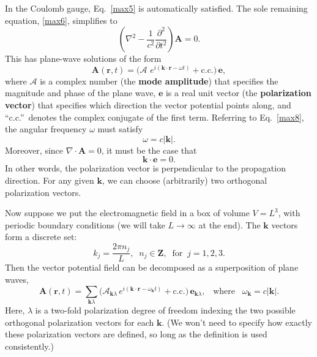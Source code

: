 \documentclass[pra,12pt]{revtex4}
\begin{document}
In the Coulomb gauge, Eq.~\eqref{max5} is automatically satisfied.
The sole remaining equation, \eqref{max6}, simplifies to
\begin{equation}
  \left(\nabla^2 - \frac{1}{c^2}\frac{\partial^2}{\partial t^2}\right)
  \mathbf{A} = 0. \label{max8}
\end{equation}
This has plane-wave solutions of the form
\begin{equation}
  \mathbf{A}(\mathbf{r},t) = \Big(\mathcal{A}\, \,
  e^{i(\mathbf{k}\cdot\mathbf{r} - \omega t)} + \mathrm{c.c.}\Big)\,
  \mathbf{e},
  \label{lightplanewave}
\end{equation}
where $\mathcal{A}$ is a complex number (the \textbf{mode amplitude})
that specifies the magnitude and phase of the plane wave, $\mathbf{e}$
is a real unit vector (the \textbf{polarization vector}) that
specifies which direction the vector potential points along, and
``c.c.''~denotes the complex conjugate of the first term.  Referring
to Eq.~\eqref{max8}, the angular frequency $\omega$ must satisfy
\begin{equation}
  \omega = c|\mathbf{k}|.
\end{equation}
Moreover, since $\nabla \cdot \mathbf{A} = 0$, it must be the case
that
\begin{equation}
  \mathbf{k} \cdot \mathbf{e} = 0.
\end{equation}
In other words, the polarization vector is perpendicular to the
propagation direction.  For any given $\mathbf{k}$, we can choose
(arbitrarily) two orthogonal polarization vectors.

Now suppose we put the electromagnetic field in a box of volume $V =
L^3$, with periodic boundary conditions (we will take $L \rightarrow
\infty$ at the end).  The $\mathbf{k}$ vectors form a discrete set:
\begin{equation}
  k_j = \frac{2\pi n_j}{L}, \;\; n_j \in \mathbf{Z}, \;\;\mathrm{for}
  \;\; j = 1,2,3.
\end{equation}
Then the vector potential field can be decomposed as a superposition
of plane waves,
\begin{equation}
  \mathbf{A}(\mathbf{r},t) = \sum_{\mathbf{k}\lambda} 
  \Big(\mathcal{A}_{\mathbf{k}\lambda} \, e^{i(\mathbf{k}\cdot\mathbf{r} - \omega_{\mathbf{k}} t)}
  + \mathrm{c.c.}\Big)\, \mathbf{e}_{\mathbf{k}\lambda},
  \;\;\; \mathrm{where}
  \;\;\;\omega_{\mathbf{k}} = c|\mathbf{k}|.
\end{equation}
Here, $\lambda$ is a two-fold polarization degree of freedom indexing
the two possible orthogonal polarization vectors for each
$\mathbf{k}$.  (We won't need to specify how exactly these
polarization vectors are defined, so long as the definition is used
consistently.)
\end{document}
